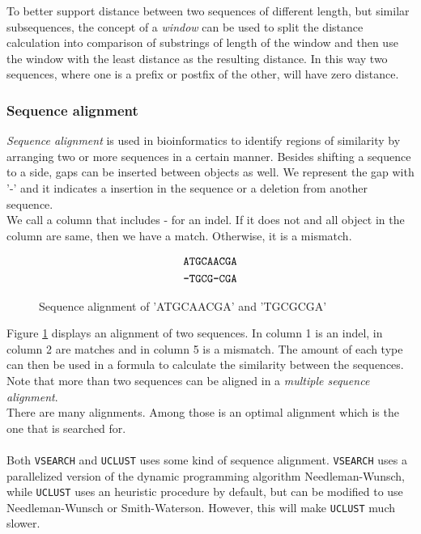 To better support distance between two sequences of different length, but
similar subsequences, the concept of a \emph{window} can be used to split the
distance calculation into comparison of substrings of length of the window
and then use the window with the least distance as the resulting distance. In
this way two sequences, where one is a prefix or postfix of the other, will
have zero distance.




\subsubsection{Sequence alignment}
\emph{Sequence alignment} is used in bioinformatics to identify regions of
similarity by arranging two or more sequences in a certain manner. Besides
shifting a sequence to a side, gaps can be inserted between objects as well. We
represent the gap with '-' and it indicates a insertion in the sequence or a
deletion from another sequence.\\
We call a column that includes - for an indel. If it does not and all object in
the column are same, then we have a match. Otherwise, it is a mismatch.\\
\begin{figure}[h!]
  \centering
  	  \begin{align*}
  	  	\mbox{\texttt{ATGCAACGA}} \\
      	\mbox{\texttt{-TGCG-CGA}}
  	  \end{align*}
  \caption{Sequence alignment of 'ATGCAACGA' and 'TGCGCGA'}
  \label{fig:seqAlignment}
\end{figure}
Figure \ref{fig:seqAlignment} displays an alignment of two sequences. In
column 1 is an indel, in column 2 are matches and in column 5 is a mismatch. 
The amount of each type can then be used in a formula to calculate the 
similarity between the sequences. Note that more than two sequences can be 
aligned in a \emph{multiple
sequence alignment}. \\
There are many alignments. Among those is an optimal alignment which is the one that is searched for. \\
\\
Both \texttt{VSEARCH} and \texttt{UCLUST} uses some kind of sequence alignment. \texttt{VSEARCH} uses a parallelized version of the dynamic programming algorithm Needleman-Wunsch, while \texttt{UCLUST} uses an heuristic procedure by default, but can be modified to use Needleman-Wunsch or Smith-Waterson. However, this will make \texttt{UCLUST} much slower.

